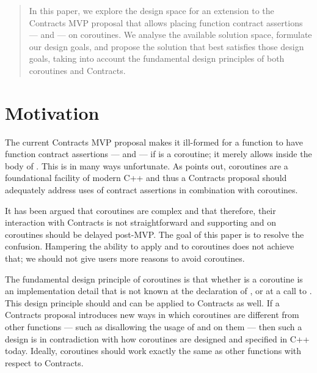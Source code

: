 \begin{abstract}
In this paper, we explore the design space for an extension to the Contracts MVP proposal \cite{P2900R8} that allows placing function contract assertions ---  and 
 --- on coroutines. We analyse the available solution space, formulate our design goals, and propose the solution that best satisfies those design goals, taking into account the fundamental design principles of both coroutines and Contracts.
\end{abstract}


\tableofcontents*





\section{Motivation}
\label{intro}

The current Contracts MVP proposal \cite{P2900R8} makes it ill-formed for a function  to have function contract assertions ---  and  --- if  is a coroutine; it merely allows  inside the body of . This is in many ways unfortunate. As \cite{P3173R0} points out, coroutines are a foundational facility of modern C++ and thus a Contracts proposal should adequately address uses of contract assertions in combination with coroutines.

It has been argued that coroutines are complex and that therefore, their interaction with Contracts is not straightforward and supporting  and  on coroutines should be delayed post-MVP. The goal of this paper is to resolve the confusion. Hampering the ability to apply  and  to coroutines does not achieve that; we should not give users more reasons to avoid coroutines.

The fundamental design principle of coroutines is that whether  is a coroutine is an implementation detail that is not known at the declaration of , or at a call to . This design principle should and can be applied to Contracts as well. If a Contracts proposal introduces new ways in which coroutines are different from other functions --- such as disallowing the usage of  and  on them --- then such a design is in contradiction with how coroutines are designed and specified in C++ today. Ideally, coroutines should work exactly the same as other functions with respect to Contracts.

